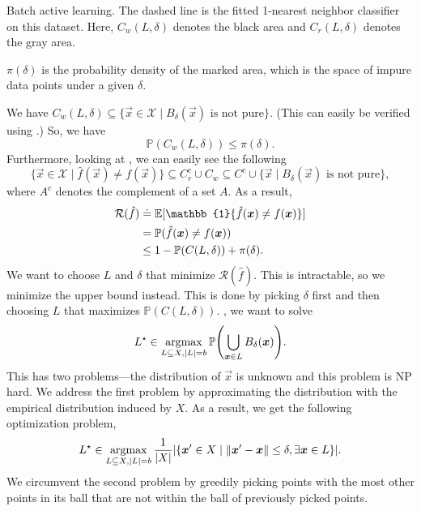 \begin{marginfigure}
    \centering
    \caption{Batch active learning. The dashed line is the fitted 1-nearest neighbor classifier on this dataset. Here, $C_w(L, \delta)$ denotes the black area and $C_r(L, \delta)$ denotes the gray area.}
    \label{fig:batch-active-learning}
\end{marginfigure}

\begin{marginfigure}
    \centering
    \caption{$\pi(\delta)$ is the probability density of the marked area, which is the space of impure data points under a given $\delta$.}
    \label{fig:batch-active-learning-pi}
\end{marginfigure}

We have $C_w(L, \delta) \subseteq \{ \vec{x} \in \mathcal{X} \mid \text{$B_{\delta}(\vec{x})$ is
        not pure} \}$. (This can easily be verified using
.) So, we have \[
    \mathbb{P}(C_w(L, \delta)) \leq \pi(\delta).
\]
Furthermore, looking at , we can easily see the following \[
    \{ \vec{x} \in \mathcal{X} \mid \hat{f}(\vec{x}) \neq f(\vec{x}) \} \subseteq C_r^c \cup C_w \subseteq C^c \cup \{ \vec{x} \mid \text{$B_{\delta}(\vec{x})$ is not pure} \},
\]
where $A^c$ denotes the complement of a set $A$. As a result,
\begin{align*}
    \mathcal{R}(\hat{f}) & \doteq \E[\mathbb{1}\{ \hat{f}(\vec{x}) \neq f(\vec{x}) \}] \\
                         & = \mathbb{P}( \hat{f}(\vec{x}) \neq f(\vec{x}))             \\
                         & \leq 1 - \mathbb{P}\lft( C(L, \delta) \rgt) + \pi(\delta).
\end{align*}
We want to choose $L$ and $\delta$ that minimize $\mathcal{R}(\hat{f})$. This is
intractable, so we minimize the upper bound instead. This is done by picking $\delta$ first and
then choosing $L$ that maximizes $\mathbb{P}(C(L, \delta))$. \Ie, we want to solve \[
    L^\star \in \argmax_{L \subseteq X, |L|=b} \mathbb{P}\lft( \bigcup_{\vec{x} \in L} B_{\delta}(\vec{x}) \rgt).
\]
This has two problems---the distribution of $\vec{x}$ is unknown and this problem is NP hard. We
address the first problem by approximating the distribution with the empirical distribution induced
by $X$. As a result, we get the following optimization problem, \[
    L^\star \in \argmax_{L \subseteq X, |L| = b} \frac{1}{|X|} \lft| \lft\{ \vec{x}' \in X \;\middle|\; \| \vec{x}' - \vec{x} \| \leq \delta, \exists \vec{x} \in L \rgt\} \rgt|.
\]
We circumvent the second problem by greedily picking points with the most other points in its ball
that are not within the ball of previously picked points.
